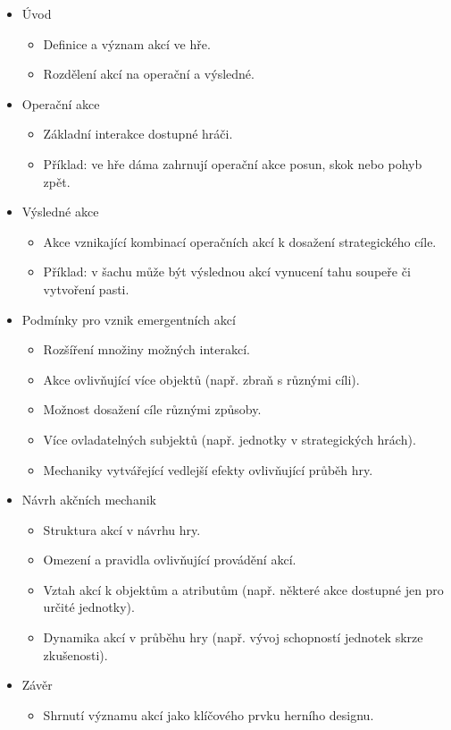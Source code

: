 \begin{itemize}
    \item Úvod  
    \begin{itemize}
        \item Definice a význam akcí ve hře.  
        \item Rozdělení akcí na operační a výsledné.  
    \end{itemize}
    \item Operační akce  
    \begin{itemize}
        \item Základní interakce dostupné hráči.  
        \item Příklad: ve hře dáma zahrnují operační akce posun, skok nebo pohyb zpět.  
    \end{itemize}
    \item Výsledné akce  
    \begin{itemize}
        \item Akce vznikající kombinací operačních akcí k dosažení strategického cíle.  
        \item Příklad: v šachu může být výslednou akcí vynucení tahu soupeře či vytvoření pasti.  
    \end{itemize}
    \item Podmínky pro vznik emergentních akcí  
    \begin{itemize}
        \item Rozšíření množiny možných interakcí.  
        \item Akce ovlivňující více objektů (např. zbraň s různými cíli).  
        \item Možnost dosažení cíle různými způsoby.  
        \item Více ovladatelných subjektů (např. jednotky v strategických hrách).  
        \item Mechaniky vytvářející vedlejší efekty ovlivňující průběh hry.  
    \end{itemize}
    \item Návrh akčních mechanik  
    \begin{itemize}
        \item Struktura akcí v návrhu hry.  
        \item Omezení a pravidla ovlivňující provádění akcí.  
        \item Vztah akcí k objektům a atributům (např. některé akce dostupné jen pro určité jednotky).  
        \item Dynamika akcí v průběhu hry (např. vývoj schopností jednotek skrze zkušenosti).  
    \end{itemize}
    \item Závěr  
    \begin{itemize}
        \item Shrnutí významu akcí jako klíčového prvku herního designu.  
    \end{itemize}
\end{itemize}


